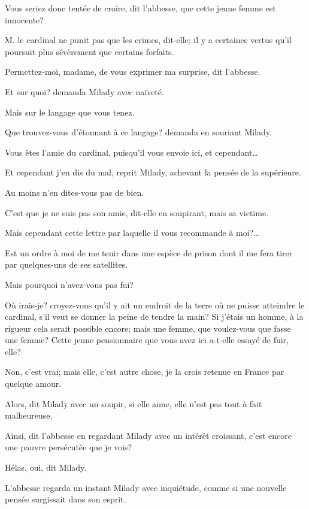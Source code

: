 \speak  Vous seriez donc tentée de croire, dit l'abbesse, que cette jeune femme est innocente? 

\speak  M. le cardinal ne punit pas que les crimes, dit-elle; il y a certaines vertus qu'il poursuit plus sévèrement que certains forfaits. 

\speak  Permettez-moi, madame, de vous exprimer ma surprise, dit l'abbesse. 

\speak  Et sur quoi? demanda Milady avec naïveté. 

\speak  Mais sur le langage que vous tenez. 

\speak  Que trouvez-vous d'étonnant à ce langage? demanda en souriant Milady. 

\speak  Vous êtes l'amie du cardinal, puisqu'il vous envoie ici, et cependant\dots 

\speak  Et cependant j'en dis du mal, reprit Milady, achevant la pensée de la supérieure. 

\speak  Au moins n'en dites-vous pas de bien. 

\speak  C'est que je ne suis pas son amie, dit-elle en soupirant, mais sa victime. 

\speak  Mais cependant cette lettre par laquelle il vous recommande à moi?\dots 

\speak  Est un ordre à moi de me tenir dans une espèce de prison dont il me fera tirer par quelques-uns de ses satellites. 

\speak  Mais pourquoi n'avez-vous pas fui? 

\speak  Où irais-je? croyez-vous qu'il y ait un endroit de la terre où ne puisse atteindre le cardinal, s'il veut se donner la peine de tendre la main? Si j'étais un homme, à la rigueur cela serait possible encore; mais une femme, que voulez-vous que fasse une femme? Cette jeune pensionnaire que vous avez ici a-t-elle essayé de fuir, elle? 

\speak  Non, c'est vrai; mais elle, c'est autre chose, je la crois retenue en France par quelque amour. 

\speak  Alors, dit Milady avec un soupir, si elle aime, elle n'est pas tout à fait malheureuse. 

\speak  Ainsi, dit l'abbesse en regardant Milady avec un intérêt croissant, c'est encore une pauvre persécutée que je vois? 

\speak  Hélas, oui, dit Milady. 

L'abbesse regarda un instant Milady avec inquiétude, comme si une nouvelle pensée surgissait dans son esprit. 

